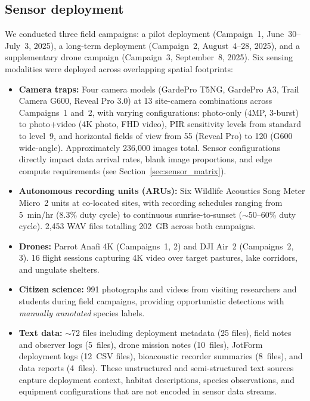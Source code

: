 \documentclass[12pt]{article}
\begin{document}
\subsection{Sensor deployment}

We conducted three field campaigns: a pilot deployment (Campaign~1, June~30--July~3, 2025), a long-term deployment (Campaign~2, August~4--28, 2025), and a supplementary drone campaign (Campaign~3, September~8, 2025). Six sensing modalities were deployed across overlapping spatial footprints:

\begin{itemize}
    \item \textbf{Camera traps:} Four camera models (GardePro T5NG, GardePro A3, Trail Camera G600, Reveal Pro 3.0) at 13 site-camera combinations across Campaigns~1 and~2, with varying configurations: photo-only (4MP, 3-burst) to photo+video (4K photo, FHD video), PIR sensitivity levels from standard to level~9, and horizontal fields of view from 55\textdegree{} (Reveal Pro) to 120\textdegree{} (G600 wide-angle). Approximately 236,000 images total. Sensor configurations directly impact data arrival rates, blank image proportions, and edge compute requirements (see Section~\ref{sec:sensor_matrix}).
    \item \textbf{Autonomous recording units (ARUs):} Six Wildlife Acoustics Song Meter Micro~2 units at co-located sites, with recording schedules ranging from 5~min/hr (8.3\% duty cycle) to continuous sunrise-to-sunset ($\sim$50--60\% duty cycle). 2,453 WAV files totalling 202~GB across both campaigns.
    \item \textbf{Drones:} Parrot Anafi 4K (Campaigns~1, 2) and DJI Air~2 (Campaigns~2, 3). 16 flight sessions capturing 4K video over target pastures, lake corridors, and ungulate shelters.
    \item \textbf{Citizen science:} 991 photographs and videos from visiting researchers and students during field campaigns, providing opportunistic detections with \textit{manually annotated} species labels.
    \item \textbf{Text data:} $\sim$72 files including deployment metadata (25 files), field notes and observer logs (5~files), drone mission notes (10~files), JotForm deployment logs (12~CSV files), bioacoustic recorder summaries (8~files), and data reports (4~files). These unstructured and semi-structured text sources capture deployment context, habitat descriptions, species observations, and equipment configurations that are not encoded in sensor data streams.
\end{itemize}
\end{document}
